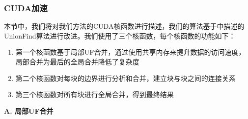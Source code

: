 \documentclass[a4paper, 11pt]{article}
\begin{document}
\subsubsection{CUDA加速}
本节中，我们将对我们方法的CUDA核函数进行描述，我们的算法基于\autocite{DBLP:journals/corr/abs-1708-08180}中描述的UnionFind算法进行改进。我们使用了三个核函数，每个核函数的功能如下：
\begin{enumerate}
    \item 第一个核函数基于局部UF合并，通过使用共享内存来提升数据的访问速度，局部合并为最后的全局合并降低了复杂度
    \item 第二个核函数对每块的边界进行分析和合并，建立块与块之间的连接关系
    \item 第三个核函数对所有块进行全局合并，得到最终结果
\end{enumerate}

\textbf{A. 局部UF合并}
\end{document}

